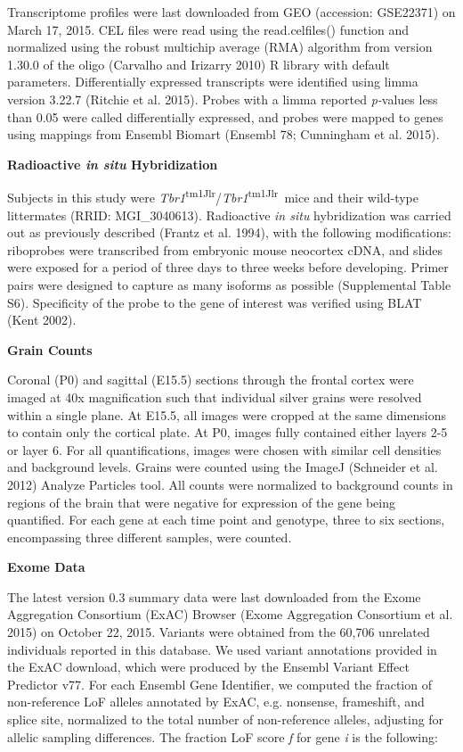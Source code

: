 \documentclass[]{article}
\begin{document}
Transcriptome profiles were last downloaded from GEO (accession:
GSE22371) on March 17, 2015. CEL files were read using the
read.celfiles() function and normalized using the robust multichip
average (RMA) algorithm from version 1.30.0 of the oligo (Carvalho and
Irizarry 2010) R library with default parameters. Differentially
expressed transcripts were identified using limma version 3.22.7
(Ritchie et al. 2015). Probes with a limma reported \emph{p­-}values
less than 0.05 were called differentially expressed, and probes were
mapped to genes using mappings from Ensembl Biomart (Ensembl 78;
Cunningham et al. 2015).

\textbf{Radioactive \emph{in situ} Hybridization}

Subjects in this study were
\emph{Tbr1}\textsuperscript{tm1Jlr}/\emph{Tbr1}\textsuperscript{tm1Jlr}~mice
and their wild-type littermates (RRID: MGI\_3040613). Radioactive
\emph{in situ} hybridization was carried out as previously described
(Frantz et al. 1994), with the following modifications: riboprobes were
transcribed from embryonic mouse neocortex cDNA, and slides were exposed
for a period of three days to three weeks before developing. Primer
pairs were designed to capture as many isoforms as possible
(Supplemental Table S6). Specificity of the probe to the gene of
interest was verified using BLAT (Kent 2002).

\textbf{Grain Counts}

Coronal (P0) and sagittal (E15.5) sections through the frontal cortex
were imaged at 40x magnification such that individual silver grains were
resolved within a single plane. At E15.5, all images were cropped at the
same dimensions to contain only the cortical plate. At P0, images fully
contained either layers 2-5 or layer 6. For all quantifications, images
were chosen with similar cell densities and background levels. Grains
were counted using the ImageJ (Schneider et al. 2012) Analyze Particles
tool. All counts were normalized to background counts in regions of the
brain that were negative for expression of the gene being quantified.
For each gene at each time point and genotype, three to six sections,
encompassing three different samples, were counted.

\textbf{Exome Data}

The latest version 0.3 summary data were last downloaded from the Exome
Aggregation Consortium (ExAC) Browser (Exome Aggregation Consortium et
al. 2015) on October 22, 2015. Variants were obtained from the 60,706
unrelated individuals reported in this database. We used variant
annotations provided in the ExAC download, which were produced by the
Ensembl Variant Effect Predictor v77. For each Ensembl Gene Identifier,
we computed the fraction of non-reference LoF alleles annotated by ExAC,
e.g. nonsense, frameshift, and splice site, normalized to the total
number of non-reference alleles, adjusting for allelic sampling
differences. The fraction LoF score \emph{f} for gene \emph{i} is the
following:
\end{document}
